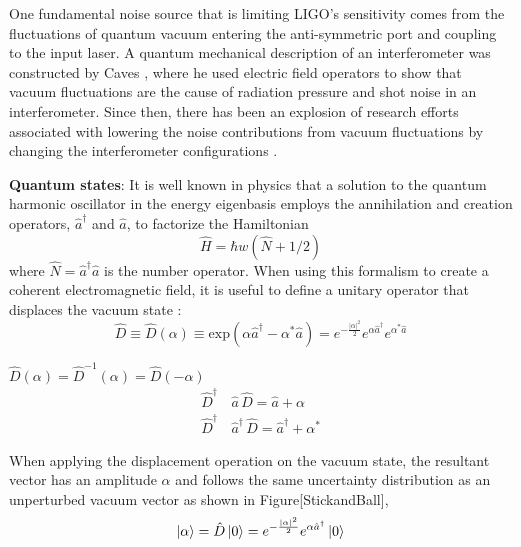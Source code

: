 		One fundamental noise source that is limiting LIGO's sensitivity comes from the fluctuations of quantum vacuum entering the anti-symmetric port and coupling to the input laser. A quantum mechanical description of an interferometer was constructed by Caves \cite{CavesQMNoise}\cite{Caves2photon} \cite{CavesOscillator}, where he used electric field operators to show that vacuum fluctuations are the cause of radiation pressure and shot noise in an interferometer.  Since then, there has been an explosion of research efforts associated with lowering the noise contributions from vacuum fluctuations by changing the interferometer configurations \cite{BuonannoChenQMNoise} \cite{ChenQND}.
		
		\textbf{Quantum states}:
		It is well known in physics \cite{Shankar} \cite{Griffiths} that a solution to the quantum harmonic oscillator in the energy eigenbasis employs the annihilation and creation  operators, $\hat{a}^{\dagger}$ and $\hat{a}$, to factorize the Hamiltonian
		\begin{equation}
		\hat{H} = \hbar w (\hat{N} + 1/2)
		\end{equation} 
		where $\hat{N} = \hat{a}^{\dagger}  \hat{a}$ is the number operator.  When using this formalism to create a coherent electromagnetic field, it is useful to define a unitary operator that displaces the vacuum state \cite{GerryKnight}:
		\begin{equation}
		\hat{D} \equiv \hat{D}(\alpha) \equiv \text{exp}(\alpha \hat{a}^{\dagger} - \alpha^{*} \hat{a} ) = e^{-\frac{\vert{\alpha}\vert^2}{2}} e^{\alpha \hat{a}^{\dagger} } e^{\alpha^{*} \hat{a} }
		\end{equation}
		
		
		$\hat{D}(\alpha) = \hat{D}^{-1}(\alpha) = \hat{D}(-\alpha)$
		\begin{equation}
		\begin{aligned}
		\hat{D}^\dagger&\, \hat{a} 		\,\hat{D}			= \hat{a} + \alpha \\ 
		\hat{D}^\dagger&\, \hat{a}^\dagger \,\hat{D} 		= \hat{a}^\dagger + \alpha^*
		\end{aligned}
		\end{equation}
		
		When applying the displacement operation on the vacuum state, the resultant vector has an amplitude $\alpha$ and follows the same uncertainty distribution as an unperturbed vacuum vector as shown in Figure[StickandBall],
		\begin{equation}
		\ket{\alpha} = \hat{D} \ket{0} =  e^{-\frac{\vert{\alpha}\vert^2}{2}} e^{\alpha \hat{a}^{\dagger} } \ket{0}
		\end{equation}
		
